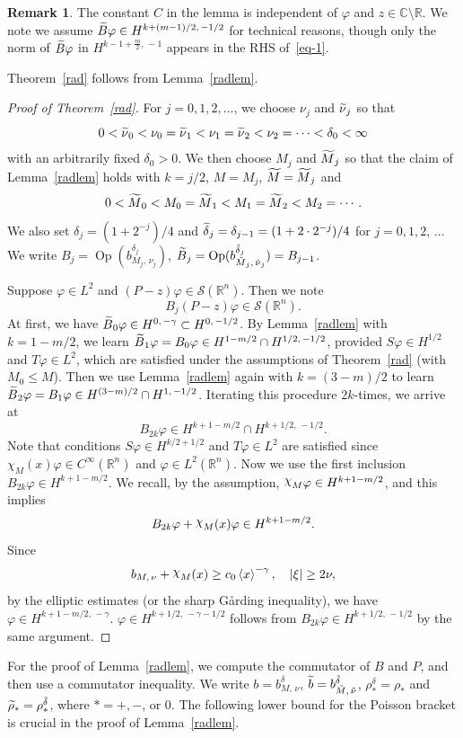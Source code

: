 \documentclass[10pt]{amsart}
\theoremstyle{definition}
\newtheorem{rema}[cdrthm]{Remark}
\renewcommand*\c{\gamma}
\renewcommand*\d{\delta}
\newcommand*\f{\varphi}
\renewcommand*\i{\mbox{\raisebox{.5ex}{$\chi$}}}
\newcommand*\n{\nu}
\newcommand*\x{\xi}
\DeclareMathOperator{\Op}{Op}
\newcommand*\re{\mathbb{R}}
\newcommand*\co{\mathbb{C}}
\newcommand{\clS}{\mathcal{S}}
\newcommand{\jap}[1]{\left\langle #1 \right\rangle}
\let\oldtilde\tilde
\renewcommand*{\tilde}[1]{\mathchoice{\widetilde{#1}}{\widetilde{#1}}{\oldtilde{#1}}{\oldtilde{#1}}}
\begin{document}
\begin{rema}
The constant $C$ in the lemma is independent of $\f$ and $z\in\co\setminus\re$. We note we assume $\tilde B\f\in H^{k+(m-1)/2,\,-1/2}$ for technical reasons, though only the norm of $\tilde B\f$ in $H^{k-1+\frac{m}{2},\,-1}$ appears in the RHS of~\eqref{eq-1}.
\end{rema}

Theorem~\ref{rad} follows from Lemma~\ref{radlem}.

\begin{proof}[Proof of Theorem~\ref{rad}]
For $j=0,1,2,\dots$, we choose $\n_{j}$ and $\tilde\n_{j}$ so that
\[
0<\tilde\n_0<\n_0=\tilde\n_{1} <\n_{1}=\tilde\n_2<\n_2=\cdots <\d_0<\infty
\]
with an arbitrarily fixed $\d_0>0$. We then choose $M_{j}$ and $\tilde M_{j}$ so that the claim of Lemma~\ref{radlem} holds with $k=j/2$, $M=M_{j}$, $\tilde M=\tilde M_{j}$ and
\[
0<\tilde M_0<M_0=\tilde M_{1}< M_{1}=\tilde M_2<M_2=\cdots.
\]
We also set $\d_j =(1+2^{-j})/4$ and $\tilde \d_j = \d_{j-1} =(1+2\cdot2^{-j})/4$ for $j=0, 1,2,\,\dots$ We write $B_j=\Op(b^{\d_j}_{M_{j},\,\n_{j}})$, $\tilde B_j=\Op(b^{\tilde\d_j}_{\tilde M_{j},\,\tilde\n_{j}})=B_{j-1}$.

Suppose $\f\in L^2$ and $(P-z)\f\in \clS(\re^n)$. Then we note
\[
B_j(P-z)\f\in \clS(\re^n).
\]
At first, we have $\tilde B_0\f\in H^{0,\,-\c}\subset H^{0,\,-1/2}$. By Lemma~\ref{radlem} with $k=1-m/2$, we learn $\tilde B_{1}\f=B_0\f \in H^{1-m/2}\cap H^{1/2,\,-1/2}$, provided $S\f\in H^{1/2}$ and $T\f\in L^2$, which are satisfied under the assumptions of Theorem~\ref{rad} (with $M_0\leq M$). Then we use Lemma~\ref{radlem} again with $k=(3-m)/2$ to learn $\tilde B_2\f=B_1\f\in H^{(3-m)/2}\cap H^{1,\,-1/2}$. Iterating this procedure $2k$-times, we arrive at
\[
B_{2k}\f\in H^{k+1-m/2}\cap H^{k+1/2,\,-1/2}.
\]
Note that conditions $S\f\in H^{k/2+1/2}$ and $T\f\in L^2$ are satisfied since $\chi_M(x)\f\in C^{\infty}(\re^n)$ and $\f\in L^2(\re^n)$. Now we use the first inclusion $B_{2k}\f\in H^{k+1-m/2}$. We recall, by the assumption, $\i_{M}\f\in H^{k+1-m/2}$, and this implies
\[
B_{2k}\f+\i_M(x)\f \in H^{k+1-m/2}.
\]
Since
\[
b_{M,\,\n}+\i_{M}(x) \geq c_0\jap{x}^{-\c}, \quad |\x|\geq 2\n,
\]
by the elliptic estimates (or the sharp G{\aa}rding inequality), we have $\f\in H^{k+1-m/2,\,-\c}$. $\f\in H^{k+1/2,\,-\c-1/2}$ follows from $B_{2k}\f\in H^{k+1/2,\,-1/2}$ by the same argument.
\end{proof}

For the proof of Lemma~\ref{radlem}, we compute the commutator of $B$ and $P$, and then use a commutator inequality. We write $b=b^\d_{M,\,\n}$, $\tilde b = b^{\tilde\d}_{\tilde M,\,\tilde\n}$, $\rho^\d_*=\rho_*$ and $\tilde\rho_*=\rho^{\tilde\d}_*$, where $*=+,-$, or $0$. The following lower bound for the Poisson bracket is crucial in the proof of Lemma~\ref{radlem}.
\end{document}
